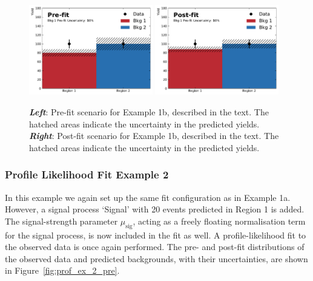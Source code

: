 \begin{figure}[!htb]
    \begin{center}
        \includegraphics[width=0.48\textwidth]{figures/common_ana/stat_hypo/profile_examples/profile_ex_1_NP10_pre}
        \includegraphics[width=0.48\textwidth]{figures/common_ana/stat_hypo/profile_examples/profile_ex_1_NP10_post}
        \caption{
            \textbf{\textit{Left}}: Pre-fit scenario for Example 1b, described in the text.
                The hatched areas indicate the uncertainty in the predicted yields.
            \textbf{\textit{Right}}: Post-fit scenario for Example 1b, described in the text.
                The hatched areas indicate the uncertainty in the predicted yields.
        }
        \label{fig:prof_ex_1_np10}
    \end{center}
\end{figure}

\subsubsection{Profile Likelihood Fit Example 2}
\label{sec:profiling_example_2}

In this example we again set up the same fit configuration as in Example 1a.
However, a signal process `Signal' with 20 events predicted in Region 1 is added.
The signal-strength parameter $\mu_{\text{sig}}$, acting as a freely floating normalisation
term for the signal process, is now included in the fit as well.
A profile-likelihood fit to the observed data is once again performed.
The pre- and post-fit distributions of the observed data and predicted backgrounds,
with their uncertainties, are shown in Figure~\ref{fig:prof_ex_2_pre}.

